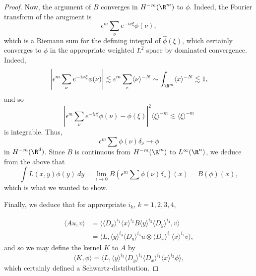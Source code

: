 \documentclass[12pt]{article}
\begin{document}
\begin{proof}
Now, the argument of $B$ converges in $H^{-m}(\R^m)$ to $\phi$. Indeed, the Fourier transform of the arugment is
\[\epsilon^m \sum_{\nu} e^{-i\nu \xi}\phi(\nu),\] which is a Riemann sum for the defining integral of $\hat{\phi}(\xi)$, which certainly converges to $\hat{\phi}$ in the appropriate weighted $L^2$ space by dominated convergence. Indeed,
\[\left|\epsilon^m\sum_{\nu} e^{-i\nu \xi}\phi(\nu)\right| \lesssim \epsilon^m \sum_{\epsilon} \langle \nu \rangle^{-N} \sim \int_{\R^m} \langle x \rangle^{-N} \lesssim 1,\]
and so
\[\left|\epsilon^m \sum_{\nu} e^{-i\nu \xi}\phi(\nu)-\phi(\xi)\right|^2\langle \xi \rangle^{-m} \lesssim \langle \xi \rangle^{-m}\] is integrable. Thus,
\[\epsilon^m \sum \phi(\nu)\delta_\nu \to \phi\] in $H^{-m}(\R^d)$. Since $B$ is continuous from $H^{-m}(\R^m)$ to $L^\infty(\R^n)$, we deduce from the above that
\[\int L(x,y)\phi(y)\ dy = \lim_{\epsilon \to 0}B\left(\epsilon^m \sum \phi(\nu)\delta_\nu\right)(x) = B(\phi)(x),\] which is what we wanted to show. 

Finally, we deduce that for approrpriate $i_k$, $k=1,2,3,4$,

\begin{align*}\langle Au,v\rangle &= \langle \langle D_x\rangle^{i_1}\langle x \rangle^{i_2} B \langle y \rangle^{i_3}\langle D_y\rangle^{i_4},v\rangle\\
&= \langle L, \langle y \rangle^{i_3}\langle D_y\rangle^{i_4} u \otimes \langle D_x\rangle^{i_1}\langle x \rangle^{i_2} v\rangle,\end{align*}
and so  we may define the kernel $K$ to $A$ by
\[\langle K,\phi\rangle = \langle L,\langle y \rangle^{i_3}\langle D_y\rangle^{i_4}\langle D_x\rangle^{i_1}\langle x \rangle^{i_2}\phi\rangle,\]
which certainly defined a Schwartz-distribution.


\end{proof}
\end{document}
